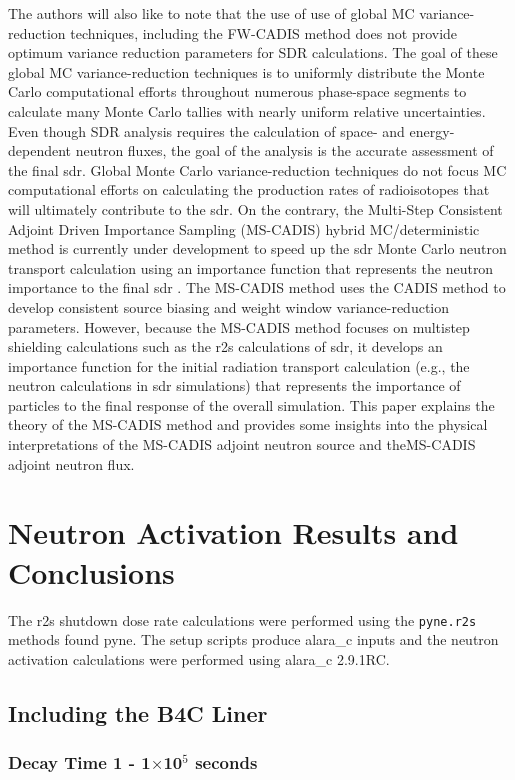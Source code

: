 \documentclass[12pt]{article}
\begin{document}
The authors will also like to note that the use of use of global MC variance-reduction techniques, including the FW-CADIS method does not provide optimum variance reduction parameters for SDR calculations. The goal of these global MC variance-reduction techniques is to uniformly distribute the Monte Carlo computational efforts throughout numerous phase-space segments to calculate many Monte Carlo tallies with nearly uniform relative uncertainties. Even though SDR analysis requires the calculation of space- and energy-dependent neutron fluxes, the goal of the analysis is the accurate assessment of the final \gls{sdr}. Global Monte Carlo variance-reduction techniques do not focus MC computational efforts on calculating the production rates of radioisotopes that will ultimately contribute to the \gls{sdr}. On the contrary, the Multi-Step Consistent Adjoint Driven Importance Sampling (MS-CADIS) hybrid MC/deterministic method is currently under development to speed up the \gls{sdr} Monte Carlo neutron transport calculation using an importance function that represents the neutron importance to the final \gls{sdr} \cite{mscadis}. The MS-CADIS method uses the CADIS method to develop consistent source biasing and weight window variance-reduction parameters. However, because the MS-CADIS method focuses on multistep shielding calculations such as the \gls{r2s} calculations of \gls{sdr}, it develops an importance function for the initial radiation transport calculation (e.g., the neutron calculations in \gls{sdr} simulations) that represents the importance of particles to the final response of the overall simulation. This paper explains the theory of the MS-CADIS method and provides some insights into the physical interpretations of the MS-CADIS adjoint neutron source and theMS-CADIS adjoint neutron flux.

 
\newpage
\clearpage

\section{Neutron Activation Results and Conclusions}
The \gls{r2s} shutdown dose rate calculations were performed using the
\texttt{pyne.r2s} methods found \gls{pyne}. The setup scripts produce
\gls{alara_c} inputs and the neutron activation calculations were performed
using \gls{alara_c} 2.9.1RC. 
\subsection{Including the B4C Liner}
\subsubsection{Decay Time 1 - 1$\times$10$^{5}$ seconds}
\end{document}
